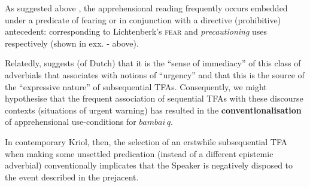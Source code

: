  

As suggested above \citep[see also][]{Angelo2016}, the apprehensional reading frequently occurs embedded under a predicate of fearing or in conjunction with a directive (prohibitive) antecedent: corresponding to Lichtenberk's \textsc{fear} and \textit{precautioning} uses respectively (shown in exx. - above).

Relatedly, \citet[192\textit{ff}]{Boogaart2020} suggests (of Dutch) that it is the ``sense of immediacy'' of this class of adverbials that associates with notions of ``urgency'' and that this is the source of the ``expressive nature'' of subsequential TFAs. Consequently, we might hypothesise that the frequent association of sequential TFAs with these discourse contexts (situations of urgent warning) has resulted in the \textbf{conventionalisation} of apprehensional use-conditions for $\textit{bambai}\,q.$ 

In contemporary Kriol, then, the selection of an erstwhile subsequential TFA when making some unsettled predication (instead of a different epistemic adverbial)  conventionally implicates that the Speaker is negatively disposed to the event described in the prejacent.

